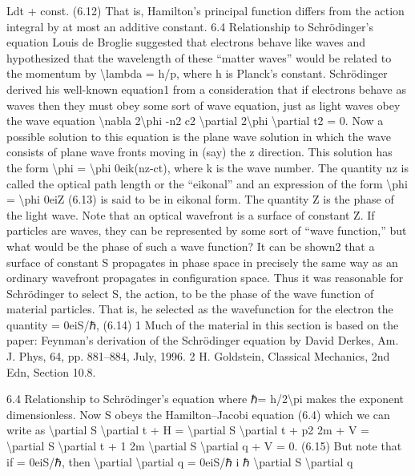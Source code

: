 \begin{exercise}
Ldt + const.
(6.12)
That is, Hamilton's principal function differs from the action integral by at
most an additive constant.
6.4 Relationship to Schrödinger's equation
Louis de Broglie suggested that electrons behave like waves and hypothesized
that the wavelength of these ``matter waves'' would be related to the momentum
by \textbackslash{}lambda  = h/p, where h is Planck's constant. Schrödinger derived his well-known
equation1 from a consideration that if electrons behave as waves then they must
obey some sort of wave equation, just as light waves obey the wave equation
\textbackslash{}nabla 2\textbackslash{}phi  -n2
c2
\textbackslash{}partial 2\textbackslash{}phi
\textbackslash{}partial t2 = 0.
Now a possible solution to this equation is the plane wave solution in which
the wave consists of plane wave fronts moving in (say) the z direction. This
solution has the form
\textbackslash{}phi  = \textbackslash{}phi 0eik(nz-ct),
where k is the wave number. The quantity nz is called the optical path length
or the ``eikonal'' and an expression of the form
\textbackslash{}phi  = \textbackslash{}phi 0eiZ
(6.13)
is said to be in eikonal form. The quantity Z is the phase of the light wave.
Note that an optical wavefront is a surface of constant Z.
If particles are waves, they can be represented by some sort of ``wave function,'' but what would be the phase of such a wave function? It can be shown2
that a surface of constant S propagates in phase space in precisely the same
way as an ordinary wavefront propagates in configuration space. Thus it was
reasonable for Schrödinger to select S, the action, to be the phase of the wave
function of material particles. That is, he selected as the wavefunction for the
electron the quantity
= 0eiS/ℏ,
(6.14)
1 Much of the material in this section is based on the paper: Feynman's derivation of the
Schrödinger equation by David Derkes, Am. J. Phys, 64, pp. 881--884, July, 1996.
2 H. Goldstein, Classical Mechanics, 2nd Edn, Section 10.8.

6.4
Relationship to Schrödinger's equation
where ℏ= h/2\textbackslash{}pi  makes the exponent dimensionless.
Now S obeys the Hamilton--Jacobi equation (6.4) which we can write as
\textbackslash{}partial S
\textbackslash{}partial t + H = \textbackslash{}partial S
\textbackslash{}partial t + p2
2m + V = \textbackslash{}partial S
\textbackslash{}partial t + 1
2m
\textbackslash{}partial S
\textbackslash{}partial q
+ V = 0.
(6.15)
But note that if  = 0eiS/ℏ, then
\textbackslash{}partial
\textbackslash{}partial q = 0eiS/ℏ
i
ℏ
\textbackslash{}partial S
\textbackslash{}partial q


\end{exercise}
